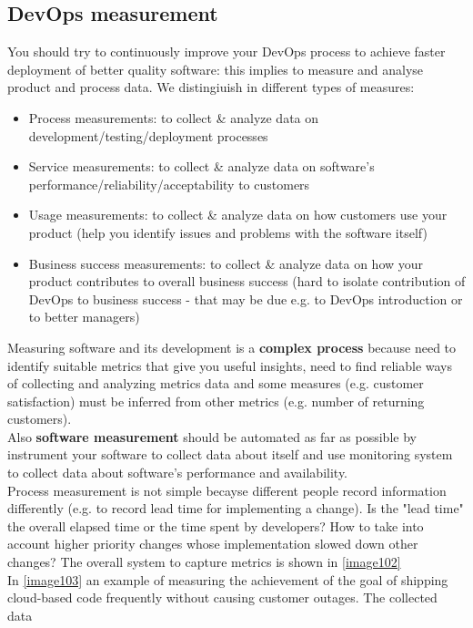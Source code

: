 \documentclass[10pt,a4paper]{report}
\begin{document}
\subsection{DevOps measurement}
You should try to continuously improve your DevOps process to achieve faster deployment of better quality software: this implies to measure and analyse product and process data. 
We distingiuish in different types of measures:
\begin{itemize}
	\item Process measurements: to collect \& analyze data on development/testing/deployment processes
	\item Service measurements:	to collect \& analyze data on software’s performance/reliability/acceptability to customers
	\item Usage measurements: to collect \& analyze data on how customers use your product (help you identify issues and problems with the software itself)
	\item Business success measurements: to collect \& analyze data on how your product contributes to overall business success (hard to isolate contribution of DevOps to business success - that may be due e.g. to DevOps introduction or to better managers)
\end{itemize}
Measuring software and its development is a \textbf{complex process} because need to identify suitable metrics that give you useful insights, need to find reliable ways of collecting and analyzing metrics data and some measures (e.g. customer satisfaction) must be inferred from other metrics (e.g. number of returning customers).\\
Also \textbf{software measurement}  should be automated as far as possible by instrument your software to collect data about itself and  use monitoring system to collect data about software’s performance and availability.\\
Process measurement is not simple becayse different people record information differently (e.g. to record lead time for implementing a change). Is the "lead time" the overall elapsed time or the time spent by developers?
How to take into account higher priority changes whose implementation slowed down other changes? The overall system to capture metrics is shown in \ref{image102}\\
In \ref{image103} an example of measuring the achievement of the goal of shipping cloud-based code frequently without causing customer outages. The collected data
\end{document}
